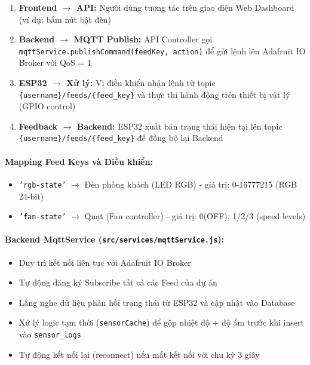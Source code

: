 \begin{enumerate}
    \item \textbf{Frontend $\rightarrow$ API:} Người dùng tương tác trên giao diện Web Dashboard (ví dụ: bấm nút bật đèn)
    \item \textbf{Backend $\rightarrow$ MQTT Publish:} API Controller gọi \texttt{mqttService.publishCommand(feedKey, action)} để gửi lệnh lên Adafruit IO Broker với QoS = 1
    \item \textbf{ESP32 $\rightarrow$ Xử lý:} Vi điều khiển nhận lệnh từ topic \texttt{\{username\}/feeds/\{feed\_key\}} và thực thi hành động trên thiết bị vật lý (GPIO control)
    \item \textbf{Feedback $\rightarrow$ Backend:} ESP32 xuất bản trạng thái hiện tại lên topic \texttt{\{username\}/feeds/\{feed\_key\}} để đồng bộ lại Backend
\end{enumerate}

\paragraph{Mapping Feed Keys và Điều khiển:}

\begin{itemize}
    \item \texttt{'rgb-state'} $\rightarrow$ Đèn phòng khách (LED RGB) - giá trị: 0-16777215 (RGB 24-bit)
    \item \texttt{'fan-state'} $\rightarrow$ Quạt (Fan controller) - giá trị: 0(OFF), 1/2/3 (speed levels)
\end{itemize}

\paragraph{Backend MqttService (\texttt{src/services/mqttService.js}):}

\begin{itemize}
    \item Duy trì kết nối liên tục với Adafruit IO Broker
    \item Tự động đăng ký Subscribe tất cả các Feed của dự án
    \item Lắng nghe dữ liệu phản hồi trạng thái từ ESP32 và cập nhật vào Database
    \item Xử lý logic tạm thời (\texttt{sensorCache}) để gộp nhiệt độ + độ ẩm trước khi insert vào \texttt{sensor\_logs}
    \item Tự động kết nối lại (reconnect) nếu mất kết nối với chu kỳ 3 giây
\end{itemize}

